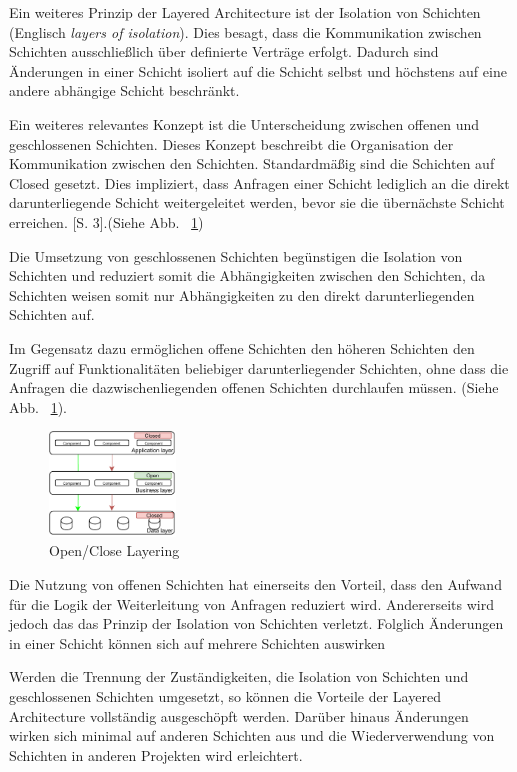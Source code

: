 \documentclass[acmtog]{acmart}
\begin{document}
Ein weiteres Prinzip der Layered Architecture ist der Isolation von Schichten (Englisch \textit{layers of isolation}).
Dies besagt, dass die Kommunikation zwischen Schichten ausschließlich über definierte Verträge erfolgt.
Dadurch sind Änderungen in einer Schicht isoliert auf die Schicht selbst und höchstens auf eine andere abhängige Schicht beschränkt.
\cite[3 - 4]{layered}

Ein weiteres relevantes Konzept ist die Unterscheidung zwischen offenen und geschlossenen Schichten.
Dieses Konzept beschreibt die Organisation der Kommunikation zwischen den Schichten.
Standardmäßig sind die Schichten auf Closed gesetzt.
Dies impliziert, dass Anfragen einer Schicht lediglich an die direkt darunterliegende Schicht weitergeleitet werden,
bevor sie die übernächste Schicht erreichen.
\cite{layered}[S. 3].(Siehe Abb. ~\ref{fig:layered-request-flow})

Die Umsetzung von geschlossenen Schichten begünstigen die Isolation von Schichten und reduziert somit die Abhängigkeiten zwischen den Schichten, da
 Schichten weisen somit nur Abhängigkeiten zu den direkt darunterliegenden Schichten auf.

Im Gegensatz dazu ermöglichen offene Schichten den höheren Schichten den Zugriff auf Funktionalitäten
beliebiger darunterliegender Schichten, ohne dass die Anfragen die dazwischenliegenden offenen Schichten durchlaufen müssen.
(Siehe Abb. ~\ref{fig:layered-request-flow}). \cite[4]{layered}

\begin{figure}[h!]
    \centering
    \includegraphics[width=0.3\textwidth]{images/layered/Layer2}
    \caption{Open/Close Layering}
    \label{fig:layered-request-flow}
\end{figure}

Die Nutzung von offenen Schichten hat einerseits den Vorteil, dass den Aufwand für die Logik der Weiterleitung von Anfragen reduziert wird.
Andererseits wird jedoch das das Prinzip der Isolation von Schichten verletzt.
Folglich Änderungen in einer Schicht können sich auf mehrere Schichten auswirken \cite[7 - 8]{layered}

Werden die Trennung der Zuständigkeiten, die Isolation von Schichten und geschlossenen Schichten umgesetzt, so
können die Vorteile der Layered Architecture vollständig ausgeschöpft werden.
Darüber hinaus Änderungen wirken sich minimal auf anderen Schichten aus und die Wiederverwendung von Schichten
in anderen Projekten wird erleichtert.
\end{document}
